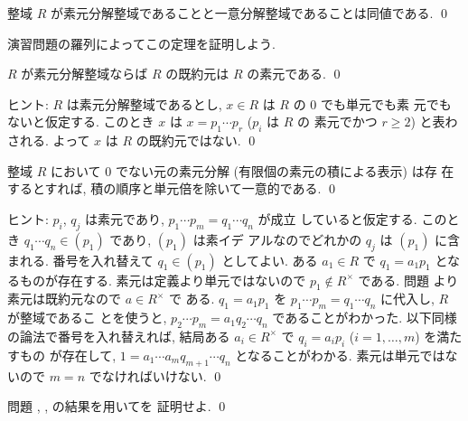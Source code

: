 \documentclass[12pt,twoside]{jarticle}
\begin{document}
\begin{theorem}
\label{theorem:FD=UFD}
  整域 $R$ が素元分解整域であることと一意分解整域であることは同値である.
  \qed
\end{theorem}

演習問題の羅列によってこの定理を証明しよう.


\begin{question}[素元分解整域における既約元は素元]
\label{q:UFD-irred-implies-prime}
  $R$ が素元分解整域ならば $R$ の既約元は $R$ の素元である.
  \qed
\end{question}

\noindent
ヒント: $R$ は素元分解整域であるとし, $x\in R$ は $R$ の $0$ でも単元でも素
元でもないと仮定する.  このとき $x$ は $x=p_1\cdots p_r$ ($p_i$ は $R$ の
素元でかつ $r\ge2$) と表わされる.  よって $x$ は $R$ の既約元ではない.
\qed


\begin{question}[整域における素元分解の一意性]
\label{q:prime-decomp-unique}
  整域 $R$ において $0$ でない元の素元分解 (有限個の素元の積による表示) は存
  在するとすれば, 積の順序と単元倍を除いて一意的である.
  \qed
\end{question}

\noindent
ヒント: $p_i$, $q_j$ は素元であり, $p_1\cdots p_m = q_1\cdots q_n$ が成立
していると仮定する.  このとき $q_1\cdots q_n\in(p_1)$ であり, $(p_1)$ は素イデ
アルなのでどれかの $q_j$ は $(p_1)$ に含まれる. 
番号を入れ替えて $q_1\in(p_1)$ としてよい.
ある $a_1\in R$ で $q_1=a_1p_1$ となるものが存在する.
素元は定義より単元ではないので $p_1\not\in R^\times$ である.
問題  より素元は既約元なので $a\in R^\times$ で
ある. 
$q_1=a_1p_1$ を $p_1\cdots p_m = q_1\cdots q_n$ に代入し, $R$ が整域であるこ
とを使うと, $p_2\cdots p_m = a_1 q_2\cdots q_n$ であることがわかった.
以下同様の論法で番号を入れ替えれば, 
結局ある $a_i\in R^\times$ で $q_i=a_ip_i$ ($i=1,\dots,m$) を満たすもの
が存在して, $1=a_1\cdots a_m q_{m+1}\cdots q_n$ となることがわかる. 
素元は単元ではないので $m=n$ でなければいけない.
\qed


\begin{question}
  問題 , 
  , 
  の結果を用いてを
  証明せよ.  \qed
\end{question}
\end{document}
